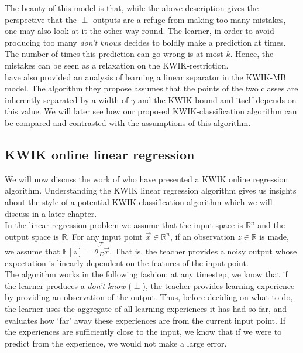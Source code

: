 The beauty of this model is that, while the above description gives the perspective that the $\perp$ outputs are a refuge from making too many mistakes, one may also look at it the other way round. The learner, in order to avoid producing too many \textit{don't know}s decides to boldly make a prediction at times. The number of times this prediction can go wrong is at most $k$. Hence, the mistakes can be seen as a relaxation on the KWIK-restriction. \\ 

\citet{DBLP:conf/nips/SayediZB10}  have also provided an analysis of learning a  linear separator in the KWIK-MB model. The algorithm they propose assumes that the points of the two classes are inherently separated by a width of $\gamma$ and the KWIK-bound and itself depends on this value. We will later see how our proposed KWIK-classification algorithm can be compared and contrasted with the assumptions of this algorithm. \\


\subsection{KWIK online linear regression}
We will now discuss the work of \citet{DBLP:conf/nips/StrehlL07}  who have presented a KWIK online regression algorithm. Understanding the KWIK linear regression algorithm gives us insights about the style of a potential KWIK classification algorithm which we will discuss in a later chapter. \\

In the linear regression problem we assume that the input space is $\mathbb{R}^n$ and the output space is $\mathbb{R}$. For any input point $\vec{x} \in \mathbb{R}^n$, if an observation $z \in \mathbb{R}$ is made, we assume that $\mathbb{E}[z] = \vec{\theta}_{E}^T \vec{x}$. That is, the teacher provides a noisy output whose expectation is linearly dependent on the features of the input point. \\

The algorithm works in the following fashion: at any timestep, we know that if the learner produces a \textit{don't know} ($\perp$), the teacher provides learning experience by providing an observation of the output. Thus, before deciding on what to do, the learner uses the aggregate of all learning experiences it has had so far, and evaluates how `far' away these experiences are from the current input point. If the experiences are sufficiently close to the input, we know that if we were to predict from the experience, we would not make a large error. 

